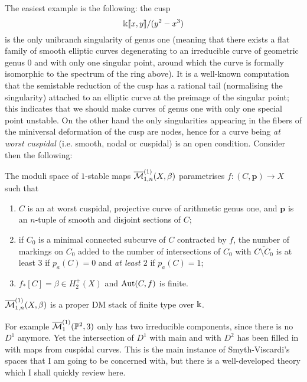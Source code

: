 The easiest example is the following: the cusp
\[\Bbbk[\![x,y]\!]/(y^2-x^3)\]
is the only unibranch singularity of genus one (meaning that there exists a flat family of smooth elliptic curves degenerating to an irreducible curve of geometric genus $0$ and with only one singular point, around which the curve is formally isomorphic to the spectrum of the ring above). It is a well-known computation \cite[\S 3.C]{HM} that the semistable reduction of the cusp has a rational tail (normalising the singularity) attached to an elliptic curve at the preimage of the singular point; this indicates that we should make curves of genus one with only one special point unstable. On the other hand the only singularities appearing in the fibers of the miniversal deformation of the cusp are nodes, hence for a curve being \emph{at worst cuspidal} (i.e. smooth, nodal or cuspidal) is an open condition. Consider then the following:
\begin{dfn}
 The moduli space of $1$-stable maps $\overline{\mathcal M}^{(1)}_{1,n}(X,\beta)$ parametrises $f\colon (C,\mathbf p)\to X$ such that
 \begin{enumerate}
  \item $C$ is an at worst cuspidal, projective curve of arithmetic genus one, and $\mathbf p$ is an $n$-tuple of smooth and disjoint sections of $C$;
  \item if $C_0$ is a minimal connected subcurve of $C$ contracted by $f$, the number of markings on $C_0$ added to the number of intersections of $C_0$ with $\overline{C\setminus C_0}$ is at least $3$ if $p_a(C)=0$ and \emph{at least $2$} if $p_a(C)=1$;
  \item $f_*[C]=\beta\in H^+_2(X)$ and $\operatorname{Aut}(C,f)$ is finite.
 \end{enumerate}
\end{dfn}
\begin{lemma}
 $\overline{\mathcal M}^{(1)}_{1,n}(X,\beta)$ is a proper DM stack of finite type over $\Bbbk$.
\end{lemma}
For example $\overline{\mathcal{M}}^{(1)}_1(\mathbb P^2,3)$ only has two irreducible components, since there is no $D^1$ anymore. Yet the intersection of $D^1$ with main and with $D^2$ has been filled in with maps from cuspidal curves. This is the main instance of Smyth-Viscardi's spaces that I am going to be concerned with, but there is a well-developed theory which I shall quickly review here.

